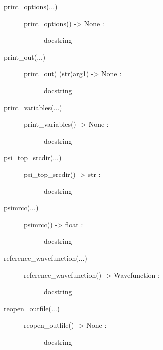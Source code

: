 \documentclass[letterpaper,10pt,english]{sphinxmanual}
\begin{document}
\begin{description}
\begin{description}
\begin{description}
\end{description}

\item[{print\_options(...)}] \leavevmode\begin{description}
\item[{print\_options() -\textgreater{} None :}] \leavevmode
docstring

\end{description}

\item[{print\_out(...)}] \leavevmode\begin{description}
\item[{print\_out( (str)arg1) -\textgreater{} None :}] \leavevmode
docstring

\end{description}

\item[{print\_variables(...)}] \leavevmode\begin{description}
\item[{print\_variables() -\textgreater{} None :}] \leavevmode
docstring

\end{description}

\item[{psi\_top\_srcdir(...)}] \leavevmode\begin{description}
\item[{psi\_top\_srcdir() -\textgreater{} str :}] \leavevmode
docstring

\end{description}

\item[{psimrcc(...)}] \leavevmode\begin{description}
\item[{psimrcc() -\textgreater{} float :}] \leavevmode
docstring

\end{description}

\item[{reference\_wavefunction(...)}] \leavevmode\begin{description}
\item[{reference\_wavefunction() -\textgreater{} Wavefunction :}] \leavevmode
docstring

\end{description}

\item[{reopen\_outfile(...)}] \leavevmode\begin{description}
\item[{reopen\_outfile() -\textgreater{} None :}] \leavevmode
docstring


\end{description}
\end{description}
\end{description}
\end{document}

